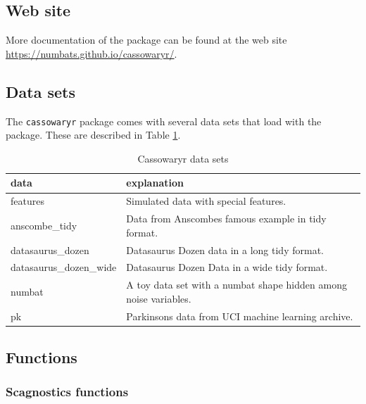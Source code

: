 \hypertarget{web-site}{%
\subsection{Web site}\label{web-site}}

More documentation of the package can be found at the web site \url{https://numbats.github.io/cassowaryr/}.

\hypertarget{data-sets}{%
\subsection{Data sets}\label{data-sets}}

The \texttt{cassowaryr} package comes with several data sets that load with the package. These are described in Table \ref{tab:datasets-tb-pdf}.

\begin{table}

\caption{\label{tab:datasets-tb-pdf}Cassowaryr data sets}
\centering
\begin{tabular}[t]{>{\raggedright\arraybackslash}p{4cm}>{\raggedright\arraybackslash}p{8cm}}
\toprule
data & explanation\\
\midrule
features & Simulated data with special features.\\
anscombe\_tidy & Data from Anscombes famous example in tidy format.\\
datasaurus\_dozen & Datasaurus Dozen data in a long tidy format.\\
datasaurus\_dozen\_wide & Datasaurus Dozen Data in a wide tidy format.\\
numbat & A toy data set with a numbat shape hidden among noise variables.\\
\addlinespace
pk & Parkinsons data from UCI machine learning archive.\\
\bottomrule
\end{tabular}
\end{table}

\hypertarget{functions}{%
\subsection{Functions}\label{functions}}

\hypertarget{scagnostics-functions}{%
\subsubsection{Scagnostics functions}\label{scagnostics-functions}}

